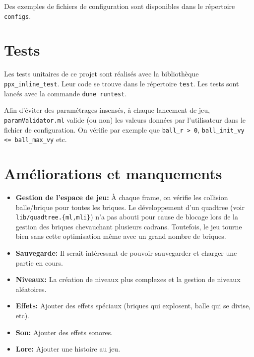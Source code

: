 \documentclass[french]{template}
\begin{document}
Des exemples de fichiers de configuration sont disponibles dans le répertoire \texttt{configs}.

\section{Tests}

Les tests unitaires de ce projet sont réalisés avec la bibliothèque \texttt{ppx\_inline\_test}. Leur code se trouve dans le répertoire \texttt{test}. Les tests sont lancés avec la commande \texttt{dune runtest}.

Afin d'éviter des paramétrages insensés, à chaque lancement de jeu, \texttt{paramValidator.ml} valide (ou non) les valeurs données par l'utilisateur dans le fichier de configuration. On vérifie par exemple que \texttt{ball\_r > 0}, \texttt{ball\_init\_vy <= ball\_max\_vy} etc.

\section{Améliorations et manquements}

\begin{itemize}
    \item \textbf{Gestion de l'espace de jeu:} À chaque frame, on vérifie les collision balle/brique pour toutes les briques. Le développement d'un quadtree (voir \texttt{lib/quadtree.\{ml,mli\}}) n'a pas abouti pour cause de blocage lors de la gestion des briques chevauchant plusieurs cadrans. Toutefois, le jeu tourne bien sans cette optimisation même avec un grand nombre de briques.
    \item \textbf{Sauvegarde:} Il serait intéressant de pouvoir sauvegarder et charger une partie en cours.
    \item \textbf{Niveaux:} La création de niveaux plus complexes et la gestion de niveaux aléatoires.
    \item \textbf{Effets:} Ajouter des effets spéciaux (briques qui explosent, balle qui se divise, etc).
    \item \textbf{Son:} Ajouter des effets sonores.
    \item \textbf{Lore:} Ajouter une histoire au jeu.
\end{itemize}
\end{document}
